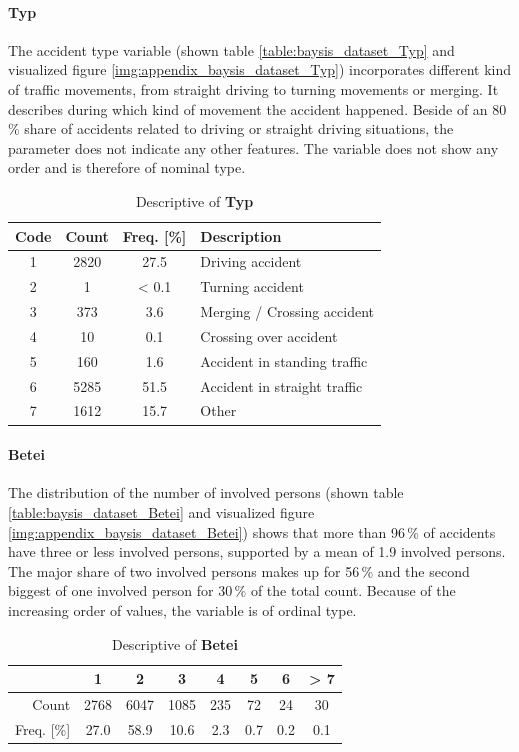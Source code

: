 \paragraph{Typ}
The accident type variable (shown table \autoref{table:baysis_dataset_Typ} and visualized figure \autoref{img:appendix_baysis_dataset_Typ}) incorporates different kind of traffic movements, from straight driving to turning movements or merging. It describes during which kind of movement the accident happened. Beside of an 80\,\% share of accidents related to driving or straight driving situations, the parameter does not indicate any other features. The variable does not show any order and is therefore of nominal type.
\begin{table}[!ht]
	\centering
	\small
	\begin{tabular}{c|c|c|l} 
		\toprule
		Code & Count & Freq. [\%] & Description \\ 
		\midrule
 		1 & 2820	& 27.5	& Driving accident \\ 
 		2 & 1		& < 0.1 & Turning accident \\
 		3 & 373		& 3.6 	& Merging / Crossing accident \\
 		4 & 10		& 0.1	& Crossing over accident \\
 		5 & 160 	& 1.6	& Accident in standing traffic \\
 		6 & 5285	& 51.5	& Accident in straight traffic \\
		7 & 1612	& 15.7 	& Other \\
		\bottomrule
	\end{tabular}
	\caption{Descriptive of \textbf{Typ}}
	\label{table:baysis_dataset_Typ}
	\vspace{-8mm}
\end{table}

\paragraph{Betei}
The distribution of the number of involved persons (shown table \autoref{table:baysis_dataset_Betei} and visualized figure \autoref{img:appendix_baysis_dataset_Betei}) shows that more than 96\,\% of accidents have three or less involved persons, supported by a mean of 1.9 involved persons. The major share of two involved persons makes up for 56\,\% and the second biggest of one involved person for 30\,\% of the total count. Because of the increasing order of values, the variable is of ordinal type.
\begin{table}[!ht]
	\centering
	\small
	\begin{tabular}{r|ccccccc} 
		\toprule
		 			& 1		& 2		& 3		& 4		& 5		& 6  	& > 7\\ 
		\midrule
 		Count 		& 2768	& 6047	& 1085	& 235	& 72 	& 24	& 30 \\ 
 		Freq. [\%] 	& 27.0	& 58.9	& 10.6 	& 2.3	& 0.7 	& 0.2 	& 0.1 \\
		\bottomrule
	\end{tabular}
	\caption{Descriptive of \textbf{Betei}}
	\label{table:baysis_dataset_Betei}
	\vspace{-8mm}
\end{table}

